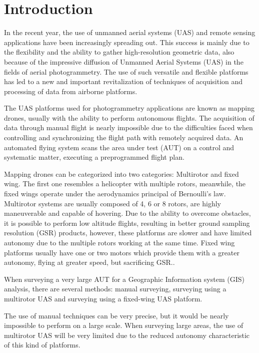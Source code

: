 \section{Introduction}

In the recent year, the use of unmanned aerial systems (UAS) and remote sensing applications have been increasingly spreading out. This success is mainly due to the flexibility and the ability to gather high-resolution geometric data, also because of the impressive diffusion of Unmanned Aerial Systems (UAS) in the fields of aerial photogrammetry. The use of such versatile and flexible platforms has led to a new and important revitalization of techniques of acquisition and processing of data from airborne platforms. \cite{Planning_airborne} 

The UAS platforms used for photogrammetry applications are known as mapping drones, usually with the ability to perform autonomous flights. The acquisition of data through manual flight is nearly impossible due to the difficulties faced when controlling and synchronizing the flight path with remotely acquired data. An automated flying system scans the area under test (AUT) on a control and systematic matter, executing a preprogrammed flight plan.

Mapping drones can be categorized into two categories: Multirotor and fixed wing. The first one resembles a helicopter with multiple rotors, meanwhile, the fixed wings operate under the aerodynamics principal of Bernoulli’s law. Multirotor systems are usually composed of 4, 6 or 8 rotors, are highly maneuverable and capable of hovering. Due to the ability to overcome obstacles, it is possible to perform low altitude flights, resulting in better ground sampling resolution (GSR) products, however, these platforms are slower and have limited autonomy due to the multiple rotors working at the same time. Fixed wing platforms usually have one or two motors which provide them with a greater autonomy, flying at greater speed, but sacrificing GSR.\cite{pulicacion}.

When surveying a very large AUT for a Geographic Information system (GIS) analysis, there are several methods: manual surveying, surveying using a multirotor UAS and surveying using a fixed-wing UAS platform.

The use of manual techniques can be very precise, but it would be nearly impossible to perform on a large scale. When surveying large areas, the use of multirotor UAS will be very limited due to the reduced autonomy characteristic of this kind of platforms.

